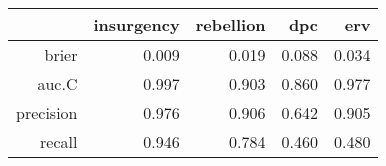 \begin{tabular}{rrrrr}
  \hline
 & insurgency & rebellion & dpc & erv \\ 
  \hline
brier & 0.009 & 0.019 & 0.088 & 0.034 \\ 
  auc.C & 0.997 & 0.903 & 0.860 & 0.977 \\ 
  precision & 0.976 & 0.906 & 0.642 & 0.905 \\ 
  recall & 0.946 & 0.784 & 0.460 & 0.480 \\ 
   \hline
\end{tabular}
